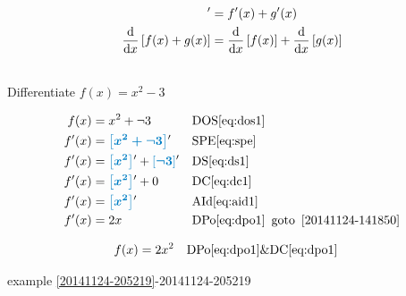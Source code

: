 \begin{arule}
\begin{align}
	[f(x) + g(x)]' &= f'(x) + g'(x) \label{eq:ds1} \\
	\dfrac{\dd}{\dx} \left[f(x) + g(x) \right] &= \dfrac{\dd}{\dx} \left[f(x) \right] + \dfrac{\dd}{\dx} \left[g(x) \right]  \label{eq:ds2}
\end{align}
\end{arule}

\begin{example}[id:20141124-152503] \label{20141124-152503} \hfill \\

Differentiate $f(x)=x^2-3$

\soln

\solnsteps
\begin{align*}
f(x) &= x^2 + \neg 3 && \text{DOS} \eqref{eq:dos1} \\
f'(x) &= \farg{x^2 + \neg 3}' && \text{SPE} \eqref{eq:spe} \\
f'(x) &= \farg{x^2}' + \farg{\neg 3}' && \text{DS} \eqref{eq:ds1} \\
f'(x) &= \farg{x^2}' + 0 && \text{DC} \eqref{eq:dc1} \\
f'(x) &= \farg{x^2}' && \text{AId} \eqref{eq:aid1} \\
f'(x) &= 2x && \text{DPo} \eqref{eq:dpo1}  \text{\, goto \,}  \ref{20141124-141850} 
\end{align*}

\soln

\lesssteps

\begin{align*}
f(x) & = 2x^2 && \text{DPo} \eqref{eq:dpo1} \& \text{DC} \eqref{eq:dpo1} 
\end{align*}

\qdepend

\qdependlist

example \ref{20141124-205219}-20141124-205219

\end{example}

